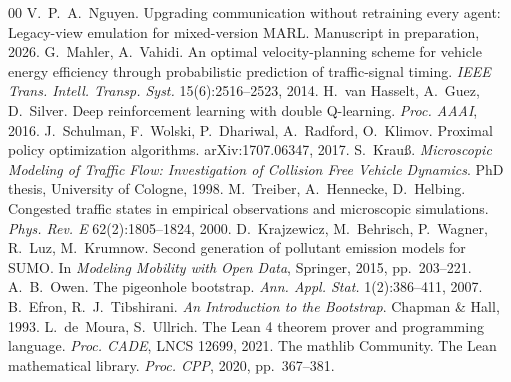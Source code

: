 \begin{thebibliography}{00}
 V.~P.~A.~Nguyen. Upgrading communication without retraining every agent: Legacy-view emulation for mixed-version MARL. Manuscript in preparation, 2026.
 G.~Mahler, A.~Vahidi. An optimal velocity-planning scheme for vehicle energy efficiency through probabilistic prediction of traffic-signal timing. \emph{IEEE Trans. Intell. Transp. Syst.} 15(6):2516--2523, 2014.
 H.~van Hasselt, A.~Guez, D.~Silver. Deep reinforcement learning with double Q-learning. \emph{Proc. AAAI}, 2016.
 J.~Schulman, F.~Wolski, P.~Dhariwal, A.~Radford, O.~Klimov. Proximal policy optimization algorithms. arXiv:1707.06347, 2017.
 S.~Krau{\ss}. \emph{Microscopic Modeling of Traffic Flow: Investigation of Collision Free Vehicle Dynamics}. PhD thesis, University of Cologne, 1998.
 M.~Treiber, A.~Hennecke, D.~Helbing. Congested traffic states in empirical observations and microscopic simulations. \emph{Phys. Rev. E} 62(2):1805--1824, 2000.
 D.~Krajzewicz, M.~Behrisch, P.~Wagner, R.~Luz, M.~Krumnow. Second generation of pollutant emission models for SUMO. In \emph{Modeling Mobility with Open Data}, Springer, 2015, pp.~203--221.
 A.~B.~Owen. The pigeonhole bootstrap. \emph{Ann. Appl. Stat.} 1(2):386--411, 2007.
 B.~Efron, R.~J.~Tibshirani. \emph{An Introduction to the Bootstrap}. Chapman \& Hall, 1993.
 L.~de~Moura, S.~Ullrich. The Lean 4 theorem prover and programming language. \emph{Proc. CADE}, LNCS 12699, 2021.
 The mathlib Community. The Lean mathematical library. \emph{Proc. CPP}, 2020, pp.~367--381.
\end{thebibliography}

\appendices
